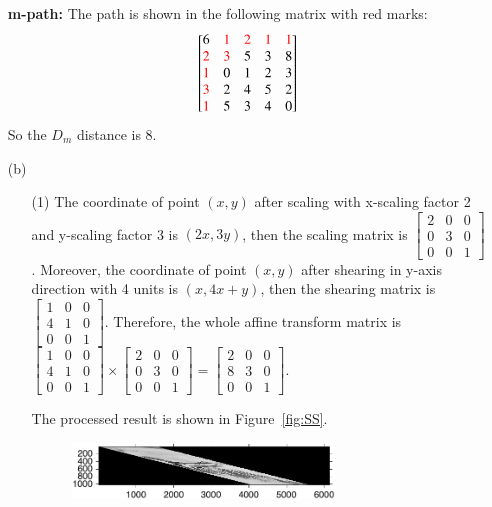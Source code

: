 \documentclass[11pt,letterpaper]{article}
\renewcommand{\r}[1]{\textcolor{red}{#1}}
\begin{document}
\begin{itemize}
	\par {\bf m-path:} The path is shown in the following matrix with red marks:
	\[\begin{bmatrix}
		6 & \r{1} & \r{2} & \r{1} & \r{1}\\ 
		\r{2} & \r{3} & 5 & 3 & 8\\ 
		\r{1} & 0 & 1 & 2 & 3\\ 
		\r{3} & 2 & 4 & 5 & 2\\ 
		\r{1} & 5 & 3 & 4 & 0
		\end{bmatrix}\] So the $D_m$ distance is 8.
	\item [(b)]
	\begin{itemize}
		\item [(1)] The coordinate of point $(x,y)$ after scaling with x-scaling factor 2 and y-scaling factor 3 is $(2x, 3y)$, then the scaling matrix is
		$\begin{bmatrix}
			2 & 0 & 0\\
			0 & 3 & 0\\
			0 & 0 & 1
		\end{bmatrix}$. Moreover, the coordinate of point $(x,y)$ after shearing in y-axis direction with 4 units is $(x, 4x + y)$, then the shearing matrix is
		$\begin{bmatrix}
			1 & 0 & 0\\
			4 & 1 & 0\\
			0 & 0 & 1
		\end{bmatrix}$.
		Therefore, the whole affine transform matrix is 
		$\begin{bmatrix}
			1 & 0 & 0\\
			4 & 1 & 0\\
			0 & 0 & 1
		\end{bmatrix}
		\times 
		\begin{bmatrix}
		2 & 0 & 0\\
		0 & 3 & 0\\
		0 & 0 & 1
		\end{bmatrix}
		=
		\begin{bmatrix}
			2 & 0 & 0\\
			8 & 3 & 0\\
			0 & 0 & 1
		\end{bmatrix}$.
		\par The processed result is shown in Figure~\ref{fig:SS}.
		\begin{figure}[b]
			\centering
			\includegraphics[width=0.7\textwidth]{images/p1b/SS.png}

\end{figure}
\end{itemize}
\end{itemize}
\end{document}
